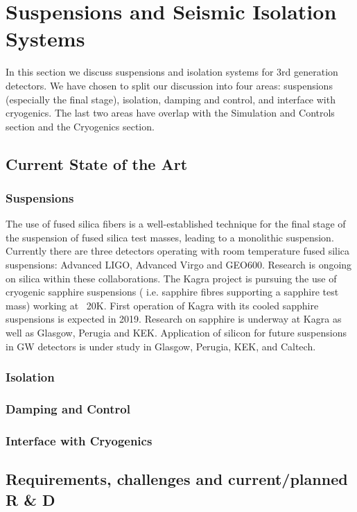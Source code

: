 \section{Suspensions and Seismic Isolation Systems}
In this section we discuss suspensions and isolation systems for 3rd generation detectors. We have chosen to split our discussion into four areas: suspensions (especially the final stage), isolation, damping and control, and interface with cryogenics. The last two areas have overlap with the Simulation and Controls section and the Cryogenics section.
\subsection{Current State of the Art}
\subsubsection{Suspensions}
The use of fused silica fibers is a well-established technique for the final stage of the suspension of fused silica test masses, leading to a monolithic suspension.  Currently there are three detectors operating with room temperature fused silica suspensions: Advanced LIGO, Advanced Virgo and GEO600. Research is ongoing on silica within these collaborations.
The Kagra project is pursuing the use of cryogenic sapphire suspensions ( i.e. sapphire fibres supporting a sapphire test mass) working at ~20K. First operation of Kagra with its cooled sapphire suspensions is expected in 2019.
Research on sapphire is underway at Kagra as well as Glasgow, Perugia and KEK.
Application of silicon for future suspensions in GW detectors is under study in Glasgow, Perugia, KEK, and Caltech.

\subsubsection{Isolation}
\subsubsection{Damping and Control}
\subsubsection{Interface with Cryogenics}



\subsection{Requirements, challenges and current/planned R \& D}

